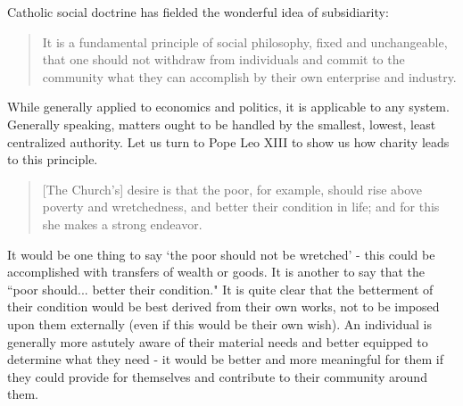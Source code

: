 \documentclass[letterpaper]{article}
\begin{document}

Catholic social doctrine has fielded the wonderful idea of subsidiarity:

\begin{quote}
  It is a fundamental principle of social philosophy, fixed and unchangeable, that one should not withdraw from individuals and commit to the community what they can accomplish by their own enterprise and industry.
\end{quote}

While generally applied to economics and politics, it is applicable to any system. Generally speaking, matters ought to be handled by the smallest, lowest, least centralized authority. Let us turn to Pope Leo XIII to show us how charity leads to this principle.

\begin{quote}
  [The Church's] desire is that the poor, for example, should rise above poverty and wretchedness, and better their condition in life; and for this she makes a strong endeavor.
\end{quote}

It would be one thing to say `the poor should not be wretched' - this could be accomplished with transfers of wealth or goods. It is another to say that the ``poor should... better their condition."  It is quite clear that the betterment of their condition would be best derived from their own works, not to be imposed upon them externally (even if this would be their own wish). An individual is generally more astutely aware of their material needs and better equipped to determine what they need - it would be better and more meaningful for them if they could provide for themselves and contribute to their community around them.
\end{document}
